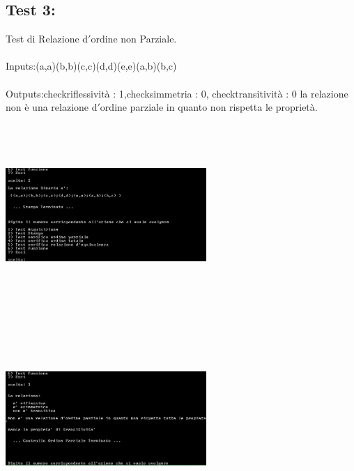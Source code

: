 \documentclass[11pt, a4paper, titlepage, block]{article}
\begin{document}
	\subsection{Test 3:} 
	Test di Relazione d$'$ordine non Parziale.\\
	\\
	Inputs:(a,a)(b,b)(c,c)(d,d)(e,e)(a,b)(b,c)\\
	\\
	Outputs:checkriflessivit\`a : 1,checksimmetria : 0, checktransitivit\`a : 0
	la relazione non \`e una relazione d$'$ordine parziale in quanto non rispetta le propriet\`a.\\
	\includegraphics[width=3in,height=3in,viewport=0 0 300 300]{../Screenshots/Test3Input.png}
	\\
	\includegraphics[width=3in,height=3in,viewport=0 0 300 300]{../Screenshots/Test3Output.png}
	\\
	\\
	\newpage
\end{document}
